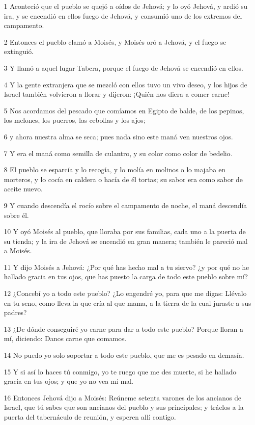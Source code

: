 \par 1 Aconteció que el pueblo se quejó a oídos de Jehová; y lo oyó Jehová, y ardió su ira, y se encendió en ellos fuego de Jehová, y consumió uno de los extremos del campamento.
\par 2 Entonces el pueblo clamó a Moisés, y Moisés oró a Jehová, y el fuego se extinguió.
\par 3 Y llamó a aquel lugar Tabera, porque el fuego de Jehová se encendió en ellos.
\par 4 Y la gente extranjera que se mezcló con ellos tuvo un vivo deseo, y los hijos de Israel también volvieron a llorar y dijeron: ¡Quién nos diera a comer carne!
\par 5 Nos acordamos del pescado que comíamos en Egipto de balde, de los pepinos, los melones, los puerros, las cebollas y los ajos;
\par 6 y ahora nuestra alma se seca; pues nada sino este maná ven nuestros ojos.
\par 7 Y era el maná como semilla de culantro, y su color como color de bedelio.
\par 8 El pueblo se esparcía y lo recogía, y lo molía en molinos o lo majaba en morteros, y lo cocía en caldera o hacía de él tortas; su sabor era como sabor de aceite nuevo.
\par 9 Y cuando descendía el rocío sobre el campamento de noche, el maná descendía sobre él.
\par 10 Y oyó Moisés al pueblo, que lloraba por sus familias, cada uno a la puerta de su tienda; y la ira de Jehová se encendió en gran manera; también le pareció mal a Moisés.
\par 11 Y dijo Moisés a Jehová: ¿Por qué has hecho mal a tu siervo? ¿y por qué no he hallado gracia en tus ojos, que has puesto la carga de todo este pueblo sobre mí?
\par 12 ¿Concebí yo a todo este pueblo? ¿Lo engendré yo, para que me digas: Llévalo en tu seno, como lleva la que cría al que mama, a la tierra de la cual juraste a sus padres?
\par 13 ¿De dónde conseguiré yo carne para dar a todo este pueblo? Porque lloran a mí, diciendo: Danos carne que comamos.
\par 14 No puedo yo solo soportar a todo este pueblo, que me es pesado en demasía.
\par 15 Y si así lo haces tú conmigo, yo te ruego que me des muerte, si he hallado gracia en tus ojos; y que yo no vea mi mal.
\par 16 Entonces Jehová dijo a Moisés: Reúneme setenta varones de los ancianos de Israel, que tú sabes que son ancianos del pueblo y sus principales; y tráelos a la puerta del tabernáculo de reunión, y esperen allí contigo.
